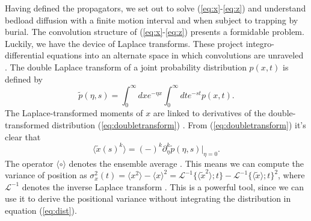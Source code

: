 \documentclass[]{agujournal2018}
\newcommand\be{\begin{equation}}
\newcommand\ee{\end{equation}}
\newcommand\bra{\langle}
\newcommand\ket{\rangle}
\newcommand\El{\mathcal{L}}
\begin{document}
Having defined the propagators, we set out to solve (\ref{eq:x}-\ref{eq:z}) and understand bedload diffusion with a finite motion interval and when subject to trapping by burial.
The convolution structure of (\ref{eq:x}-\ref{eq:z}) presents a formidable problem.
Luckily, we have the device of Laplace transforms.
These project integro-differential equations into an alternate space in which convolutions are unraveled \citep[e.g.][]{Arfken1985}.
The double Laplace transform of a joint probability distribution $p(x,t)$ is defined by 
\be \tilde{p}(\eta,s) = \int_0^\infty dx e^{-\eta x}\int_0^\infty dt e^{-st} p(x,t). \label{eq:doubletransform}\ee
The Laplace-transformed moments of $x$ are linked to derivatives of the double-transformed distribution (\ref{eq:doubletransform}) \citep[e.g.][]{Berezhkovskii2002}.
From (\ref{eq:doubletransform}) it's clear that
\be \bra \tilde{x}(s)^k \ket = (-)^k\partial_\eta^k \tilde{p}(\eta,s)\Big|_{\eta=0}.\label{eq:momenttrick}\ee
The operator $\bra \circ \ket$ denotes the ensemble average \citep[e.g.][]{Kittel1958}.
This means we can compute the variance of position as $\sigma_x^2(t) = \bra x^2 \ket - \bra x \ket^2 = \El^{-1} \{\bra\tilde{x}^2 \ket;t\} - \El^{-1} \{\bra\tilde{x} \ket;t\}^2$, where $\El^{-1}$ denotes the inverse Laplace transform \citep[e.g.][]{Arfken1985}. This is a powerful tool, since we can use it to derive the positional variance without integrating the distribution in equation (\ref{eq:dist}).
\end{document}
